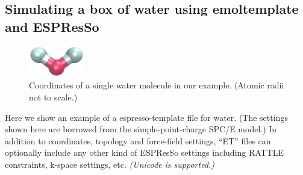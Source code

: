 \documentclass[11pt]{article}
\begin{document}
\subsection{Simulating a box of water using emoltemplate and ESPResSo}
\label{sec:spce_example}

\begin{figure}[htbp]
\centering
\includegraphics[width=2.4cm]{single_water_LR.jpg}
\caption{
\label{fig:single_water}
Coordinates of a single water molecule in our example.
(Atomic radii not to scale.)
}
\end{figure}

  Here we show an example of a espresso-template file for water.
(The settings shown here are borrowed from the simple-point-charge 
 \cite{Berendsen++StraatsmaJPhysChem1987} SPC/E model.) 
In addition to coordinates, topology and force-field settings, 
``ET'' files can optionally include any other kind of ESPResSo settings
including RATTLE constraints, k-space settings, etc.
\textit{(Unicode is supported.)}
\end{document}
